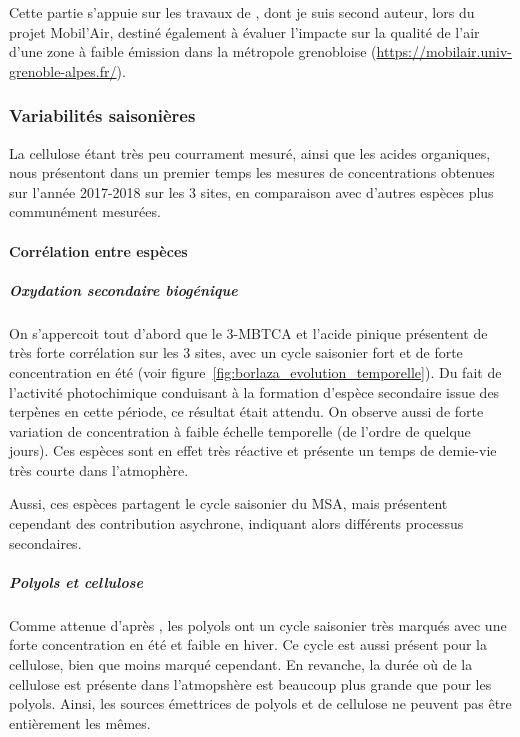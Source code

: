 \begin{tcolorbox}[colback=red!5!white,colframe=Melon,title=Note]
    Cette partie s'appuie sur les travaux de \cite{borlazaFinescaleinprep.}, dont je suis
    second auteur, lors du projet Mobil'Air, destiné également à évaluer l'impacte sur la
    qualité de l'air d'une zone à faible émission dans la métropole grenobloise 
    (\url{https://mobilair.univ-grenoble-alpes.fr/}).
\end{tcolorbox}

\subsubsection{Variabilités saisonières}%
\label{ssub:variabilites_saisonières}

La cellulose étant très peu courrament mesuré, ainsi que les acides organiques, nous
présentont dans un premier temps les mesures de concentrations obtenues sur l'année
2017-2018 sur les 3 sites, en comparaison avec d'autres espèces plus communément mesurées.

\paragraph{Corrélation entre espèces}%
\label{par:correlation_entre_especes}

\subparagraph{Oxydation secondaire biogénique}%
\label{par:oxydation_secondaire_biogénique}

On s'appercoit tout d'abord que le 3-MBTCA et l'acide pinique présentent de très forte
corrélation sur les 3 sites, avec un cycle saisonier fort et de forte concentration en été
(voir figure~\ref{fig:borlaza_evolution_temporelle}). Du fait de l'activité photochimique
conduisant à la formation d'espèce secondaire issue des terpènes en cette période, ce
résultat était attendu. On observe aussi de forte variation de concentration à faible
échelle temporelle (de l'ordre de quelque jours). Ces espèces sont en effet très réactive
et présente un temps de demie-vie très courte dans l'atmophère.

Aussi, ces espèces partagent le cycle saisonier du MSA, mais présentent cependant des
contribution asychrone, indiquant alors différents processus secondaires.

\subparagraph{Polyols et cellulose}%
\label{par:oxydation_secondaire_anthrophique}

Comme attenue d'après \cite{samakePolyols2019}, les polyols ont un cycle saisonier très
marqués avec une forte concentration en été et faible en hiver. Ce cycle est aussi présent
pour la cellulose, bien que moins marqué cependant. En revanche, la durée où de la
cellulose est présente dans l'atmopshère est beaucoup plus grande que pour les polyols.
Ainsi, les sources émettrices de polyols et de cellulose ne peuvent pas être entièrement
les mêmes.

